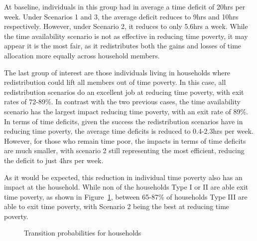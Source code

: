 \documentclass[
  11pt,
]{article}
\begin{document}
At baseline, individuals in this group had in average a time deficit of
20hrs per week. Under Scenarios 1 and 3, the average deficit reduces to
9hrs and 10hrs respectively. However, under Scenario 2, it reduces to
only 5.6hrs a week. While the time availability scenario is not as
effective in reducing time poverty, it may appear it is the most fair,
as it redistributes both the gains and losses of time allocation more
equally across household members.

The last group of interest are those individuals living in households
where redistribution could lift all members out of time poverty. In this
case, all redistribution scenarios do an excellent job at reducing time
poverty, with exit rates of 72-89\%. In contrast with the two previous
cases, the time availability scenario has the largest impact reducing
time poverty, with an exit rate of 89\%. In terms of time deficits,
given the success the redistribution scenarios have in reducing time
poverty, the average time deficits is reduced to 0.4-2.3hrs per week.
However, for those who remain time poor, the impacts in terms of time
deficits are much smaller, with scenario 2 still representing the most
efficient, reducing the deficit to just 4hrs per week.

As it would be expected, this reduction in individual time poverty also
has an impact at the household. While non of the households Type I or II
are able exit time poverty, as shown in Figure~\ref{fig-transition2},
between 65-87\% of households Type III are able to exit time poverty,
with Scenario 2 being the best at reducing time poverty.

\begin{figure}[H]


\caption{\label{fig-transition2}Transition probabilities for households}

\end{figure}%
\end{document}

